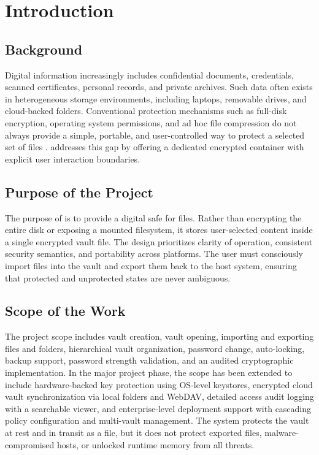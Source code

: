 \chapter{Introduction}
\section{Background}
Digital information increasingly includes confidential documents, credentials, scanned certificates, personal records, and private archives. Such data often exists in heterogeneous storage environments, including laptops, removable drives, and cloud-backed folders. Conventional protection mechanisms such as full-disk encryption, operating system permissions, and ad hoc file compression do not always provide a simple, portable, and user-controlled way to protect a selected set of files \cite{ferguson_cryptoeng}. \projname{}  addresses this gap by offering a dedicated encrypted container with explicit user interaction boundaries.

\section{Purpose of the Project}
The purpose of \projname{} is to provide a digital safe for files. Rather than encrypting the entire disk or exposing a mounted filesystem, it stores user-selected content inside a single encrypted vault file. The design prioritizes clarity of operation, consistent security semantics, and portability across platforms. The user must consciously import files into the vault and export them back to the host system, ensuring that protected and unprotected states are never ambiguous.

\section{Scope of the Work}
The project scope includes vault creation, vault opening, importing and exporting files and folders, hierarchical vault organization, password change, auto-locking, backup support, password strength validation, and an audited cryptographic implementation. In the major project phase, the scope has been extended to include hardware-backed key protection using OS-level keystores, encrypted cloud vault synchronization via local folders and WebDAV, detailed access audit logging with a searchable viewer, and enterprise-level deployment support with cascading policy configuration and multi-vault management. The system protects the vault at rest and in transit as a file, but it does not protect exported files, malware-compromised hosts, or unlocked runtime memory from all threats.

